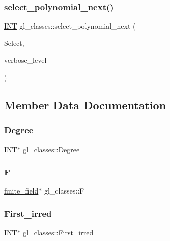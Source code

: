 \subsubsection{\texorpdfstring{select\+\_\+polynomial\+\_\+next()}{select\_polynomial\_next()}}
{\footnotesize\ttfamily \mbox{\hyperlink{galois_8h_a09fddde158a3a20bd2dcadb609de11dc}{I\+NT}} gl\+\_\+classes\+::select\+\_\+polynomial\+\_\+next (\begin{DoxyParamCaption}\item[{\mbox{\hyperlink{galois_8h_a09fddde158a3a20bd2dcadb609de11dc}{I\+NT}} $\ast$}]{Select,  }\item[{\mbox{\hyperlink{galois_8h_a09fddde158a3a20bd2dcadb609de11dc}{I\+NT}}}]{verbose\+\_\+level }\end{DoxyParamCaption})}



\subsection{Member Data Documentation}
\mbox{\label{classgl__classes_ac38251565bab5ac8ea95d0e4eb0a457d}} 
\subsubsection{\texorpdfstring{Degree}{Degree}}
{\footnotesize\ttfamily \mbox{\hyperlink{galois_8h_a09fddde158a3a20bd2dcadb609de11dc}{I\+NT}}$\ast$ gl\+\_\+classes\+::\+Degree}

\mbox{\label{classgl__classes_a488ed3305aee4f953b86c06a26031df6}} 
\subsubsection{\texorpdfstring{F}{F}}
{\footnotesize\ttfamily \mbox{\hyperlink{classfinite__field}{finite\+\_\+field}}$\ast$ gl\+\_\+classes\+::F}

\mbox{\label{classgl__classes_ab092b4bd1149c3893b2acbb5d11d29b9}} 
\subsubsection{\texorpdfstring{First\+\_\+irred}{First\_irred}}
{\footnotesize\ttfamily \mbox{\hyperlink{galois_8h_a09fddde158a3a20bd2dcadb609de11dc}{I\+NT}}$\ast$ gl\+\_\+classes\+::\+First\+\_\+irred}

